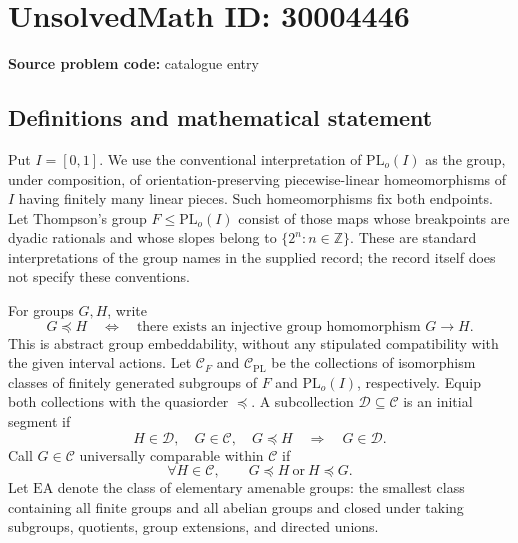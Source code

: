 \documentclass[11pt]{article}
\newcommand{\Z}{\mathbb{Z}}
\begin{document}
\section*{UnsolvedMath ID: 30004446}
\textbf{Source problem code:} catalogue entry
\subsection{Definitions and mathematical statement}
Put \(I=[0,1]\). We use the conventional interpretation of \(\mathrm{PL}_o(I)\) as the group, under composition, of orientation-preserving piecewise-linear homeomorphisms of \(I\) having finitely many linear pieces. Such homeomorphisms fix both endpoints. Let Thompson's group \(F\leq \mathrm{PL}_o(I)\) consist of those maps whose breakpoints are dyadic rationals and whose slopes belong to \(\{2^n:n\in\Z\}\). These are standard interpretations of the group names in the supplied record; the record itself does not specify these conventions.

For groups \(G,H\), write
\[
G\preccurlyeq H
\quad\Longleftrightarrow\quad
\text{there exists an injective group homomorphism }G\longrightarrow H.
\]
This is abstract group embeddability, without any stipulated compatibility with the given interval actions. Let \(\mathcal C_F\) and \(\mathcal C_{\mathrm{PL}}\) be the collections of isomorphism classes of finitely generated subgroups of \(F\) and \(\mathrm{PL}_o(I)\), respectively. Equip both collections with the quasiorder \(\preccurlyeq\). A subcollection \(\mathcal D\subseteq\mathcal C\) is an initial segment if
\[
H\in\mathcal D,\quad G\in\mathcal C,\quad G\preccurlyeq H
\quad\Longrightarrow\quad G\in\mathcal D.
\]
Call \(G\in\mathcal C\) universally comparable within \(\mathcal C\) if
\[
\forall H\in\mathcal C,\qquad
G\preccurlyeq H\ \text{or}\ H\preccurlyeq G.
\]
Let \(\mathrm{EA}\) denote the class of elementary amenable groups: the smallest class containing all finite groups and all abelian groups and closed under taking subgroups, quotients, group extensions, and directed unions.
\end{document}
